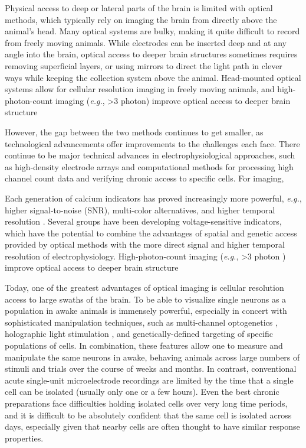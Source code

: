 Physical access to deep or lateral parts of the brain is limited with optical methods, which typically rely on imaging the brain from directly above the animal's head. Many optical systems are bulky, making it quite difficult to record from freely moving animals. While electrodes can be inserted deep and at any angle into the brain, optical access to deeper brain structures sometimes requires removing superficial layers\cite{REFREF}, or using mirrors to direct the light path in clever ways while keeping the collection system above the animal\cite{Andermann2013}. Head-mounted optical systems allow for cellular resolution imaging in freely moving animals\cite{miniscope, Helmchen2001, Sawinski2009, 3photonmini}, and high-photon-count imaging (\textit{e.g.}, >3 photon\cite{REFREF}) improve optical access to deeper brain structure

However, the gap between the two methods continues to get smaller, as technological advancements offer improvements to the challenges each face. There continue to be major technical advances in electrophysiological approaches, such as high-density electrode arrays\cite{REFREF} and computational methods for processing high channel count data and verifying chronic access to specific cells\cite{REFREF}. For imaging, 

Each generation of calcium indicators has proved increasingly more powerful, \textit{e.g.}, higher signal-to-noise (SNR), multi-color alternatives, and higher temporal resolution \cite{Akerboom2012OptimizationImaging, Chen2013UltrasensitiveActivity, REFREF}. Several groups \cite{REFREF, Adam Cohen, etc} have been developing voltage-sensitive indicators, which have the potential to combine the advantages of spatial and genetic access provided by optical methods with the more direct signal and higher temporal resolution of electrophysiology. High-photon-count imaging (\textit{e.g.}, >3 photon \cite{REFREF}) improve optical access to deeper brain structure

Today, one of the greatest advantages of optical imaging is cellular resolution access to large swaths of the brain. To be able to visualize single neurons as a population in awake animals is immensely powerful, especially in concert with sophisticated manipulation techniques, such as multi-channel optogenetics \cite{REFREF}, holographic light stimulation \cite{REFREF}, and genetically-defined targeting of specific populations of cells. In combination, these features allow one to measure and manipulate the same neurons in awake, behaving animals across large numbers of stimuli and trials over the course of weeks and months. In contrast, conventional acute single-unit microelectrode recordings are limited by the time that a single cell can be isolated (usually only one or a few hours). Even the best chronic preparations face difficulties holding isolated cells over very long time periods, and it is difficult to be absolutely confident that the same cell is isolated across days, especially given that nearby cells are often thought to have similar response properties.

